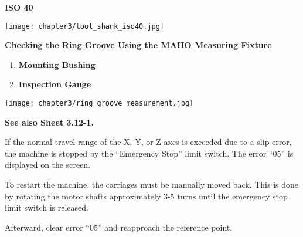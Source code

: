 \setcounter{page}{3}

\textbf{ISO 40}

\vspace{0.5cm}

\begin{minipage}{\textwidth}
    \centering
    \texttt{[image: chapter3/tool\_shank\_iso40.jpg]}
\end{minipage}

\vspace{0.5cm}

\textbf{Checking the Ring Groove Using the MAHO Measuring Fixture}

\begin{enumerate}[itemsep=1pt,parsep=0pt]
    \item \textbf{Mounting Bushing}
    \item \textbf{Inspection Gauge}
\end{enumerate}

\vspace{0.5cm}

\begin{minipage}{\textwidth}
    \centering
    \texttt{[image: chapter3/ring\_groove\_measurement.jpg]}
\end{minipage}

\vspace{0.5cm}

\textbf{See also Sheet 3.12-1.}


\setcounter{page}{2}
\setcounter{section}{15}

If the normal travel range of the X, Y, or Z axes is exceeded due to a slip error, the machine is stopped by the \enquote{Emergency Stop} limit switch. The error \enquote{05} is displayed on the screen.

To restart the machine, the carriages must be manually moved back. This is done by rotating the motor shafts approximately 3-5 turns until the emergency stop limit switch is released.

Afterward, clear error \enquote{05} and reapproach the reference point.

\vspace{.3cm}


